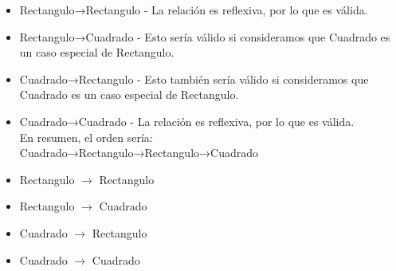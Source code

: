 \documentclass{article}
\begin{document}
\begin{itemize}
\begin{itemize}
            \begin{itemize}
                \item Rectangulo→Rectangulo - La relación es reflexiva, por lo que es válida.
                \item Rectangulo→Cuadrado - Esto sería válido si consideramos que Cuadrado es un caso especial de Rectangulo.
                \item Cuadrado→Rectangulo - Esto también sería válido si consideramos que Cuadrado es un caso especial de Rectangulo.
                \item Cuadrado→Cuadrado - La relación es reflexiva, por lo que es válida.\\ En resumen, el orden sería:\\ Cuadrado→Rectangulo→Rectangulo→Cuadrado
            \end{itemize}

            
            \begin{center}
                \begin{itemize}
                     \item[ ] Rectangulo $\rightarrow$ Rectangulo
                     \item[ ] Rectangulo $\rightarrow$ Cuadrado
                     \item[ ] Cuadrado $\rightarrow$ Rectangulo
                     \item[ ] Cuadrado $\rightarrow$ Cuadrado 
                 \end{itemize}
            \end{center} 
        \end{itemize}
    \end{itemize}
\end{document}
